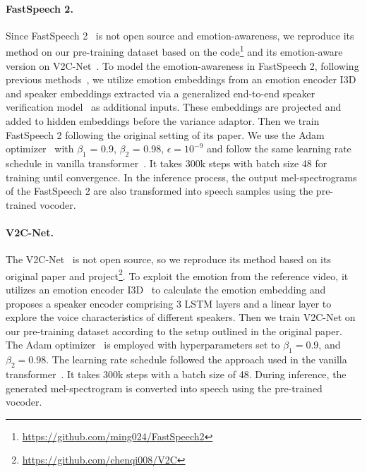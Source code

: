 \paragraph{FastSpeech 2.~~\xspace}
Since FastSpeech 2~\cite{fastspeech2/0006H0QZZL21} is not open source and emotion-awareness, we reproduce its method on our pre-training dataset based on the code\footnote{\href{https://github.com/ming024/FastSpeech2}{https://github.com/ming024/FastSpeech2}} and its emotion-aware version on V2C-Net~\cite{visualvoicecloning/Cong0QZWWJ0H23}. 
To model the emotion-awareness in FastSpeech 2, following previous methods~\cite{visualvoicecloning/ChenTQZLW22,visualvoicecloning/Cong0QZWWJ0H23}, we utilize emotion embeddings from an emotion encoder I3D~\cite{i3d/CarreiraZ17} and speaker embeddings extracted via a generalized end-to-end speaker verification model~\cite{GE2E/WanWPL18} as additional inputs. These embeddings are projected and added to hidden embeddings before the variance adaptor. 
Then we train FastSpeech 2 following the original setting of its paper. We use the Adam optimizer~\cite{adam/KingmaB14} with $\beta_1$ = 0.9, $\beta_2$ = 0.98, $\epsilon = 10^{-9}$ and follow the same learning rate schedule in vanilla transformer~\cite{attentionallyou/VaswaniSPUJGKP17}. It takes 300k steps with batch size 48 for training until convergence. In the inference process, the output mel-spectrograms of the FastSpeech 2 are also transformed into speech samples using the pre-trained vocoder.

\paragraph{V2C-Net.~~\xspace}
The V2C-Net~\cite{visualvoicecloning/ChenTQZLW22} is not open source, so we reproduce its method based on its original paper and project\footnote{\href{https://github.com/chenqi008/V2C}{https://github.com/chenqi008/V2C}}. To exploit the emotion from the reference video, it utilizes an emotion encoder I3D~\cite{i3d/CarreiraZ17} to calculate the emotion embedding and proposes a speaker encoder comprising 3 LSTM layers and a linear layer to explore the voice characteristics of different speakers.
Then we train V2C-Net on our pre-training dataset according to the setup outlined in the original paper. The Adam optimizer~\cite{adam/KingmaB14} is employed with hyperparameters set to $\beta_1 = 0.9$, and $\beta_2 = 0.98$. The learning rate schedule followed the approach used in the vanilla transformer~\cite{attentionallyou/VaswaniSPUJGKP17}. It takes 300k steps with a batch size of 48. During inference, the generated mel-spectrogram is converted into speech using the pre-trained vocoder.

